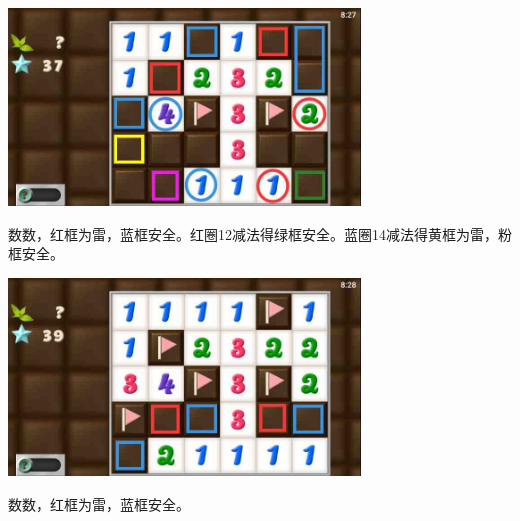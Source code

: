 \begin{center}
    \includegraphics[width=0.7\textwidth]{puzzlelow/221-4.jpg}
\end{center}
数数，红框为雷，蓝框安全。红圈12减法得绿框安全。蓝圈14减法得黄框为雷，粉框安全。
\begin{center}
    \includegraphics[width=0.7\textwidth]{puzzlelow/221-5.jpg}
\end{center}
数数，红框为雷，蓝框安全。

